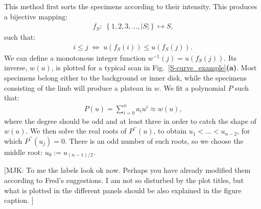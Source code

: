 \documentclass{aa}
\newcommand{\mjk}[1]{\textcolor{midgreen}{[MJK: #1]}} %
\newcommand{\eqnl}[2]{\begin{eqnarray}\label{#1}#2\end{eqnarray}}
\begin{document}
  
  
  This method first sorts the specimens according to their intensity.
  This produces a bijective mapping:
  \eqnl{scurve-mapping1}{
  f_S:\; \left\{ 1, 2, 3, ..., |S| \right\} \mapsto S \text{,}
  }
  such that:
  \eqnl{scurve-mapping2}{
  i \le j \; \Leftrightarrow \; u \left( f_S(i) \right) \le u \left( f_S(j) \right) \text{.} 
  }
  We can define a monotonous integer function $w^{-1}(j) = u(f_S(j))$.
  Its inverse, $w(u)$, is plotted for a typical scan in 
  Fig.~\ref{S-curve_example}{\bf(a)}. 
  Most specimens belong either to the background or inner disk, while the
  specimens consisting of the limb will produce a plateau in $w$.
  We fit a polynomial $P$ such that:
  \eqnl{scurve-approx}{
  P(u) = \sum \limits_{i=0}^{n} a_i u^i \approx w(u) \text{,}
  }
  where the degree should be odd and at least three in order to catch the shape
  of $w(u)$.
  We then solve the real roots of $P^{\prime\prime}(u)$, to obtain 
  $u_1 < ... < u_{n-2}$, for which $P^{\prime\prime}(u_j) = 0$.
  There is an odd number of such roots, so we choose the middle root:
  $u_0 := u_{{(n-1)}/{2}}$.
  
  \mjk{To me the labels look ok now. Perhaps you have already modified them according to Fred's suggestions. I am not so disturbed by the plot titles, but what is plotted in the different panels should be also explained in the figure caption. }
  
\end{document}
